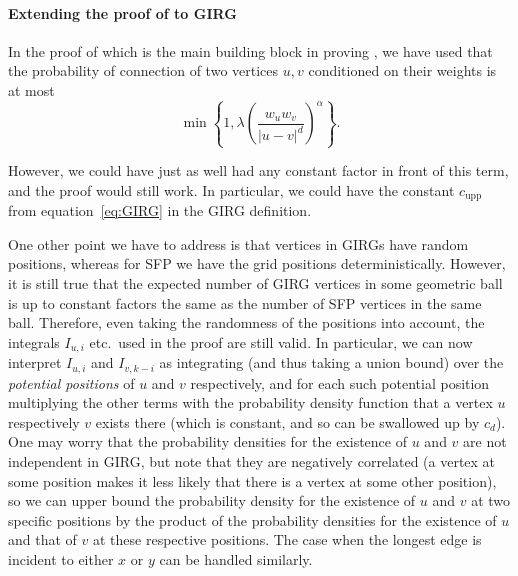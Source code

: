 \documentclass[11pt, letterpaper, margin=1in]{amsart}
\theoremstyle{definition}
\theoremstyle{remark}
\newcommand{\alphaparam}{\alpha}
\newcommand{\cupp}{c_{\text{upp}}}
\numberwithin{equation}{section}
\begin{document}
\paragraph{\textbf{Extending the proof of  to GIRG}}\label{sec:proof-GIRG} In the proof of  which is the main building block in proving , we have used that the probability of connection of two vertices $u, v$ conditioned on their weights is at most 
\[\min \left\{1,  \lambda \left(\frac{w_u w_v}{|u-v|^{d}}\right)^{\alphaparam}\right\}.\]

However, we could have just as well had any constant factor in front of this term, and the proof would still work. In particular, we could have the constant $\cupp$ from equation~\eqref{eq:GIRG} in the GIRG definition.

One other point we have to address is that vertices in GIRGs have random positions, whereas for SFP we have the grid positions deterministically. However, it is still true that the expected number of GIRG vertices in some geometric ball is up to constant factors the same as the number of SFP vertices in the same ball. Therefore, even taking the randomness of the positions into account, the integrals $I_{u, i}$ etc.\ used in the proof are still valid. In particular, we can now interpret $I_{u,i}$ and $I_{v,k-i}$ as integrating (and thus taking a union bound) over the \emph{potential positions} of $u$ and $v$ respectively, and for each such potential position multiplying the other terms with the probability density function that a vertex $u$ respectively $v$ exists there (which is constant, and so can be swallowed up by $c_d$). One may worry that the probability densities for the existence of $u$ and $v$ are not independent in GIRG, but note that they are negatively correlated (a vertex at some position makes it less likely that there is a vertex at some other position), so we can upper bound the probability density for the existence of $u$ and $v$ at two specific positions by the product of the probability densities for the existence of $u$ and that of $v$ at these respective positions. The case when the longest edge is incident to either $x$ or $y$ can be handled similarly. 
\end{document}
